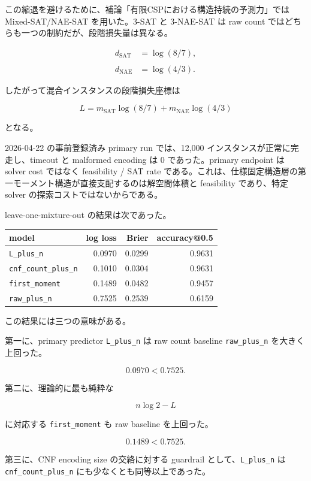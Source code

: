 \documentclass[12pt,a4paper]{article}
\begin{document}
この縮退を避けるために、補論「有限CSPにおける構造持続の予測力」では Mixed-SAT/NAE-SAT を用いた。3-SAT と 3-NAE-SAT は raw count ではどちらも一つの制約だが、段階損失量は異なる。

\[
\begin{aligned}
d_{\mathrm{SAT}}&=\log(8/7), \\
\qquad \\
d_{\mathrm{NAE}}&=\log(4/3).
\end{aligned}
\]

したがって混合インスタンスの段階損失座標は

\[
L = m_{\mathrm{SAT}}\log(8/7) + m_{\mathrm{NAE}}\log(4/3)
\]

となる。

2026-04-22 の事前登録済み primary run では、12,000 インスタンスが正常に完走し、timeout と malformed encoding は 0 であった。primary endpoint は solver cost ではなく feasibility / SAT rate である。これは、仕様固定構造層の第一モーメント構造が直接支配するのは解空間体積と feasibility であり、特定 solver の探索コストではないからである。

leave-one-mixture-out の結果は次であった。

{\def\LTcaptype{table} %
\begin{longtable}[]{@{}lrrr@{}}
\toprule\noalign{}
model & log loss & Brier & accuracy@0.5 \\
\midrule\noalign{}
\endhead
\bottomrule\noalign{}
\endlastfoot
\texttt{L\_plus\_n} & 0.0970 & 0.0299 & 0.9631 \\
\texttt{cnf\_count\_plus\_n} & 0.1010 & 0.0304 & 0.9631 \\
\texttt{first\_moment} & 0.1489 & 0.0482 & 0.9457 \\
\texttt{raw\_plus\_n} & 0.7525 & 0.2539 & 0.6159 \\
\end{longtable}
}

この結果には三つの意味がある。

第一に、primary predictor \texttt{L\_plus\_n} は raw count baseline \texttt{raw\_plus\_n} を大きく上回った。

\[
0.0970 < 0.7525.
\]

第二に、理論的に最も純粋な

\[
n\log 2-L
\]

に対応する \texttt{first\_moment} も raw baseline を上回った。

\[
0.1489 < 0.7525.
\]

第三に、CNF encoding size の交絡に対する guardrail として、\texttt{L\_plus\_n} は \texttt{cnf\_count\_plus\_n} にも少なくとも同等以上であった。
\end{document}
